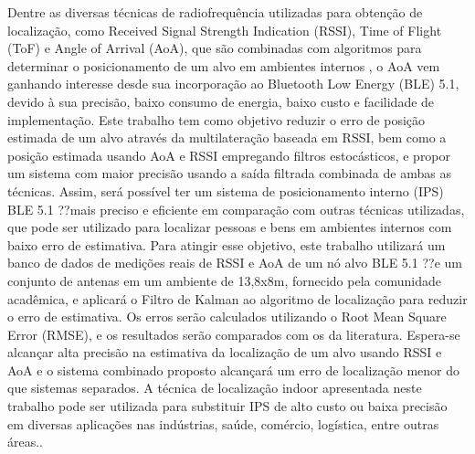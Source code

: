 \documentclass[openright]{normas-utf-tex} %
\begin{document}
\begin{resumo}
Dentre as diversas técnicas de radiofrequência utilizadas para obtenção de localização, como Received Signal Strength Indication (RSSI), Time of Flight (ToF) e Angle of Arrival (AoA), que são combinadas com algoritmos para determinar o posicionamento de um alvo em ambientes internos , o AoA vem ganhando interesse desde sua incorporação ao Bluetooth Low Energy (BLE) 5.1, devido à sua precisão, baixo consumo de energia, baixo custo e facilidade de implementação. Este trabalho tem como objetivo reduzir o erro de posição estimada de um alvo através da multilateração baseada em RSSI, bem como a posição estimada usando AoA e RSSI empregando filtros estocásticos, e propor um sistema com maior precisão usando a saída filtrada combinada de ambas as técnicas. Assim, será possível ter um sistema de posicionamento interno (IPS) BLE 5.1 ??mais preciso e eficiente em comparação com outras técnicas utilizadas, que pode ser utilizado para localizar pessoas e bens em ambientes internos com baixo erro de estimativa. Para atingir esse objetivo, este trabalho utilizará um banco de dados de medições reais de RSSI e AoA de um nó alvo BLE 5.1 ??e um conjunto de antenas em um ambiente de 13,8x8m, fornecido pela comunidade acadêmica, e aplicará o Filtro de Kalman ao algoritmo de localização para reduzir o erro de estimativa. Os erros serão calculados utilizando o Root Mean Square Error (RMSE), e os resultados serão comparados com os da literatura. Espera-se alcançar alta precisão na estimativa da localização de um alvo usando RSSI e AoA e o sistema combinado proposto alcançará um erro de localização menor do que sistemas separados. A técnica de localização indoor apresentada neste trabalho pode ser utilizada para substituir IPS de alto custo ou baixa precisão em diversas aplicações nas indústrias, saúde, comércio, logística, entre outras áreas..
\end{resumo}
\end{document}
